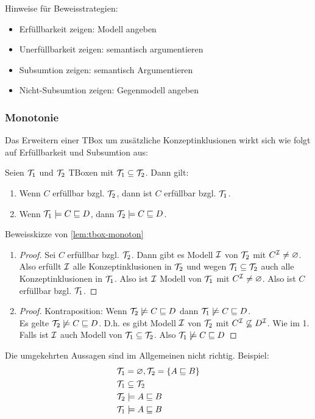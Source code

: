 Hinweise für Beweisstrategien:
\begin{itemize}
\item Erfüllbarkeit zeigen: Modell angeben
\item Unerfüllbarkeit zeigen: semantisch argumentieren
\item Subsumtion zeigen: semantisch Argumentieren
\item Nicht-Subsumtion zeigen: Gegenmodell angeben
\end{itemize}

\subsubsection{Monotonie}\label{monotonie}
Das Erweitern einer TBox um zusätzliche Konzeptinklusionen wirkt sich wie folgt auf Erfüllbarkeit und Subsumtion aus:

\begin{lemma}
\label{lem:tbox-monoton}
Seien $\mathcal{T}_1$ und $\mathcal{T}_2$ TBoxen mit $\mathcal{T}_1 \subseteq \mathcal{T}_2$. Dann gilt:
\begin{enumerate}
\item
  Wenn $C$ erfüllbar bzgl. $\mathcal{T}_2$, dann ist $C$ erfüllbar bzgl.
  $\mathcal{T}_1$.
\item
  Wenn $\mathcal{T}_1 \models C \sqsubseteq D$, dann
  $\mathcal{T}_2 \models C \sqsubseteq D$.
\end{enumerate}
\end{lemma}

\begin{tafel}[Beweisskizze]Beweisskizze von \autoref{lem:tbox-monoton}
\begin{enumerate}
  \item \begin{proof}
      Sei $C$ erfüllbar bzgl. $\mathcal{T}_2$.
  Dann gibt es Modell $\mathcal{I}$ von $\mathcal{T}_2$ mit $C^{\mathcal{I}} \neq \varnothing$.
  Also erfüllt $\mathcal{I}$ alle Konzeptinklusionen in $\mathcal{T}_2$ und wegen $\mathcal{T}_1 \subseteq \mathcal{T}_2$ auch alle Konzeptinklusionen in $\mathcal{T}_1$.
  Also ist $\mathcal{I}$ Modell von $\mathcal{T}_1$ mit $C^{\mathcal{I}} \neq \varnothing$.
  Also ist $C$ erfüllbar bzgl. $\mathcal{T}_1$.
  \end{proof}
  \item \begin{proof}
    Kontraposition: Wenn $\mathcal{T}_2 \not\models C \sqsubseteq D$ dann $\mathcal{T}_1 \not\models C \sqsubseteq D$. \\
  Es gelte $\mathcal{T}_2 \not\models C \sqsubseteq D$.
  D.h. es gibt Modell $\mathcal{I}$ von $\mathcal{T}_2$ mit $C^{\mathcal{I}} \not\subseteq D^{\mathcal{I}}$.
  Wie im 1. Falls ist $\mathcal{I}$ auch Modell von $\mathcal{T}_1 \subseteq \mathcal{T}_2$.
  Also $\mathcal{T}_1 \not\models C \sqsubseteq D$
  \end{proof}
\end{enumerate}

Die umgekehrten Aussagen sind im Allgemeinen nicht richtig. Beispiel:
\begin{align*}
    &\mathcal{T}_1 = \varnothing, \mathcal{T}_2 = \{A \sqsubseteq B\}\\
    &\mathcal{T}_1 \subseteq \mathcal{T}_2 \\
    &\mathcal{T}_2 \models A \sqsubseteq B\\
    &\mathcal{T}_1 \models A \sqsubseteq B
\end{align*}
\end{tafel}

